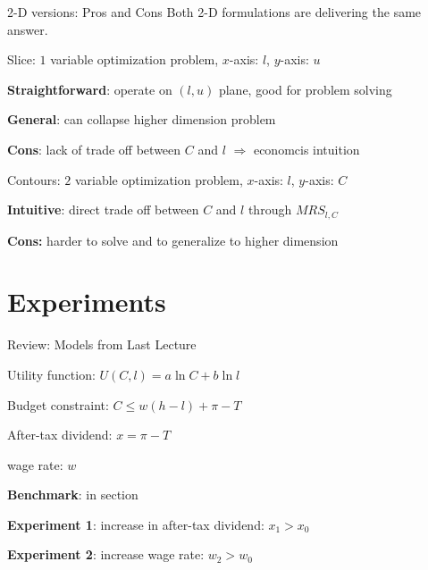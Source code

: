 \documentclass[11pt,aspectratio=169,usenames,dvipsnames]{beamer}
\let\tempone\itemize
\let\temptwo\enditemize
\renewenvironment{itemize}{\tempone\addtolength{\itemsep}{\fill}}{\temptwo}
\let\tempa\enumerate
\let\tempb\endenumerate
\renewenvironment{enumerate}{\tempa\addtolength{\itemsep}{\fill}}{\tempb}
\begin{document}
\begin{frame}{2-D versions: Pros and Cons}
\label{slide:2_D_versions__Pros_and_Cons}
    Both 2-D formulations are delivering the same answer.
    \begin{enumerate}
        \item Slice: $ 1 $ variable optimization problem, $ x $-axis: $ l $, $ y $-axis: $ u $
        \begin{itemize}
            \item \textbf{Straightforward}: operate on $ ( l, u ) $ plane, good for problem solving
            \item \textbf{General}: can collapse higher dimension problem
            \item \textbf{Cons}: lack of trade off between $ C $ and $ l $ $ \Rightarrow  $ \alert{economcis intuition}
        \end{itemize}
        \item Contours: $ 2 $ variable optimization problem, $ x $-axis: $ l $, $ y $-axis: $ C $
        \begin{itemize}
            \item \textbf{Intuitive}: direct trade off between $ C $ and $ l $ through $ MRS_{l, C} $
            \item \textbf{Cons:} harder to solve and to generalize to higher dimension
        \end{itemize}
    \end{enumerate}

\end{frame}

\section{Experiments}
\label{sec:Experiments}

\begin{frame}{Review: Models from Last Lecture}
\label{slide:Review__Models_from_Last_Lecture}
    \begin{enumerate}
        \item Utility function: $ U( C, l ) = a \ln C + b \ln l $
        \item Budget constraint: $ C \le w( h-l ) + \pi - T $
        \item After-tax dividend: $ x = \pi - T $
        \item wage rate: $ w $
    \end{enumerate}
    \begin{itemize}
        \item \textbf{Benchmark}: in section 
        \item \textbf{Experiment 1}: increase in after-tax dividend: $ x_{1} > x_{0} $
        \item \textbf{Experiment 2}: increase wage rate: $ w_{2} > w_{0} $
    \end{itemize}
\end{frame}
\end{document}
